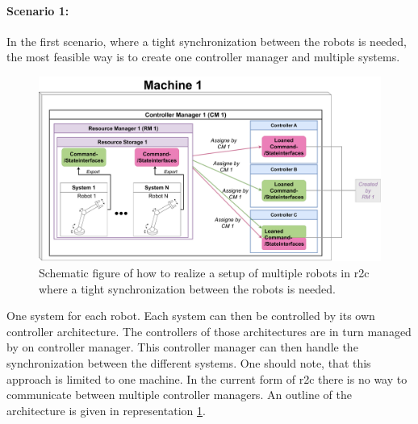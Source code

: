 \paragraph{Scenario 1:} 
In the first scenario, where a tight synchronization between the robots is needed, the most feasible way is to create one controller manager and multiple systems.
\begin{figure}[htbp]
	\centering
	\includegraphics[width=1\textwidth]{Figures/c3/multiple_robots_one_system_current-Page-1.pdf}
	\caption{Schematic figure of how to realize a setup of multiple robots in \gls{r2c} where a tight synchronization between the robots is needed.}
	\label{c3_fig_r2c_mr_ts}
\end{figure}One system for each robot. Each system can then be controlled by its own controller architecture. The controllers of those architectures are in turn managed by on controller manager. This controller manager can then handle the synchronization between the different systems.\newline
One should note, that this approach is limited to one machine. In the current form of \gls{r2c} there is no way to communicate between multiple controller managers. An outline of the architecture is given in representation \ref{c3_fig_r2c_mr_ts}.

